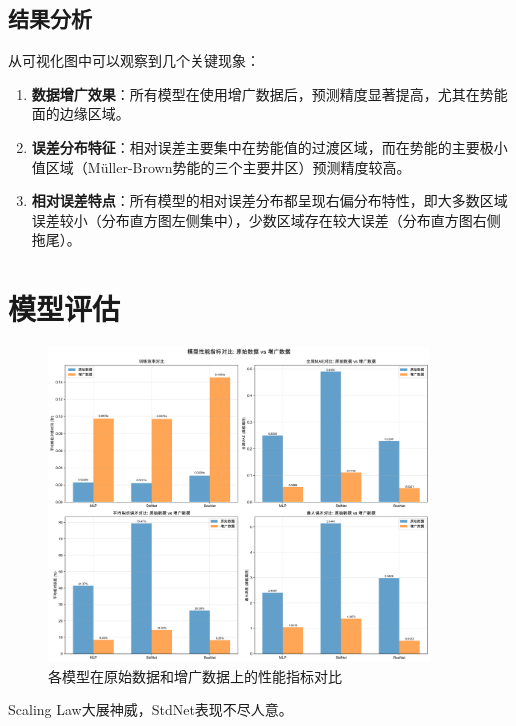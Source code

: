 \documentclass[11pt]{article}
\begin{document}
\subsection{结果分析}
从可视化图中可以观察到几个关键现象：

\begin{enumerate}
    \item \textbf{数据增广效果}：所有模型在使用增广数据后，预测精度显著提高，尤其在势能面的边缘区域。

    \item \textbf{误差分布特征}：相对误差主要集中在势能值的过渡区域，而在势能的主要极小值区域（M\"{u}ller-Brown势能的三个主要井区）预测精度较高。

    \item \textbf{相对误差特点}：所有模型的相对误差分布都呈现右偏分布特性，即大多数区域误差较小（分布直方图左侧集中），少数区域存在较大误差（分布直方图右侧拖尾）。
\end{enumerate}

\newpage
\section{模型评估}

\begin{figure}[htbp]
    \centering
    \includegraphics[width=0.9\textwidth]{results_20250330_150206/figures/性能指标对比.png}
    \caption{各模型在原始数据和增广数据上的性能指标对比}
    \label{fig:performance_comparison}
\end{figure}

Scaling Law大展神威，StdNet表现不尽人意。
\end{document}
